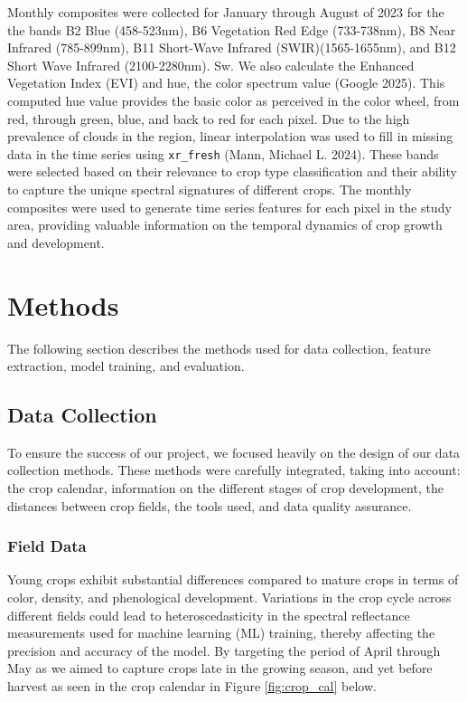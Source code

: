 \documentclass[
  journal,
  twocolumn]{IEEEtran}
\begin{document}
Monthly composites were collected for January through August of 2023 for
the the bands B2 Blue (458-523nm), B6 Vegetation Red Edge (733-738nm),
B8 Near Infrared (785-899nm), B11 Short-Wave Infrared
(SWIR)(1565-1655nm), and B12 Short Wave Infrared (2100-2280nm). Sw. We
also calculate the Enhanced Vegetation Index (EVI) and hue, the color
spectrum value (Google 2025). This computed hue value provides the basic
color as perceived in the color wheel, from red, through green, blue,
and back to red for each pixel. Due to the high prevalence of clouds in
the region, linear interpolation was used to fill in missing data in the
time series using \texttt{xr\_fresh} (Mann, Michael L. 2024). These
bands were selected based on their relevance to crop type classification
and their ability to capture the unique spectral signatures of different
crops. The monthly composites were used to generate time series features
for each pixel in the study area, providing valuable information on the
temporal dynamics of crop growth and development.

\hypertarget{methods}{%
\section{Methods}\label{methods}}

The following section describes the methods used for data collection,
feature extraction, model training, and evaluation.

\hypertarget{data-collection}{%
\subsection{Data Collection}\label{data-collection}}

To ensure the success of our project, we focused heavily on the design
of our data collection methods. These methods were carefully integrated,
taking into account: the crop calendar, information on the different
stages of crop development, the distances between crop fields, the tools
used, and data quality assurance.

\hypertarget{field-data}{%
\subsubsection{Field Data}\label{field-data}}

Young crops exhibit substantial differences compared to mature crops in
terms of color, density, and phenological development. Variations in the
crop cycle across different fields could lead to heteroscedasticity in
the spectral reflectance measurements used for machine learning (ML)
training, thereby affecting the precision and accuracy of the model. By
targeting the period of April through May as we aimed to capture crops
late in the growing season, and yet before harvest as seen in the crop
calendar in Figure \ref{fig:crop_cal} below.
\end{document}
